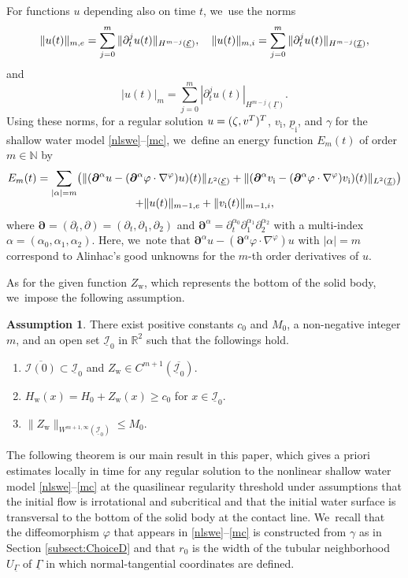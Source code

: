 \documentclass[11pt]{article}
\newenvironment{enumeratei}
{\bgroup\def\theenumi{\roman{enumi}}\def\theenumii{\arabic{enumii}}\begin{enumerate}}
{\end{enumerate}\egroup}
\newcommand{\R}{{\mathbb R}}
\newcommand{\dt}{\partial_t}
\newcommand{\cI}{{\mathcal I}}
\newcommand{\cE}{{\mathcal E}}
\newcommand{\ul}[1]{\underline{#1}}
\newcommand{\itGamma}{\mathit{\Gamma}}
\theoremstyle{definition}
\newtheorem{assumption}[theorem]{Assumption}
\begin{document}
For functions $u$ depending also on time $t$, we~use the norms
\[
\|u(t)\|_{m,{\rm e}}=\sum_{j=0}^m \|\dt^j u (t)\|_{H^{m-j}(\ul{\cE})}, \quad
\|u(t)\|_{m,{\rm i}}=\sum_{j=0}^m \|\dt^j u (t)\|_{H^{m-j}(\ul{\cI})},
\]
and
\[
|u(t)|_m = \sum_{j=0}^m |\dt^j u(t)|_{H^{m-j}(\ul{\itGamma})}.
\]
Using these norms, for a regular solution $u=(\zeta,v^{\rm T})^{\rm T}$, $v_\mathrm{i}$, $\ul{p}_\mathrm{i}$, and $\gamma$ for the shallow water model
\eqref{nlswe}--\eqref{mc}, we~define an energy function $E_m(t)$ of order $m\in\mathbb{N}$ by
\begin{multline*}
E_m(t)
= \sum_{|\alpha|=m} \bigl(\|(\bm{\partial}^\alpha u-(\bm{\partial}^\alpha\varphi\cdot\nabla^\varphi)u)(t)\|_{L^2(\ul{\cE})}
+ \|(\bm{\partial}^\alpha v_\mathrm{i}-(\bm{\partial}^\alpha\varphi\cdot\nabla^\varphi)v_\mathrm{i})(t)\|_{L^2(\ul{\cI})} \bigr) \\[-5pt]
+ \|u(t)\|_{m-1,{\rm e}} + \|v_\mathrm{i}(t)\|_{m-1,{\rm i}},
\end{multline*}
where $\bm{\partial}=(\dt,\partial)=(\dt,\partial_1,\partial_2)$ and $\bm{\partial}^\alpha=\dt^{\alpha_0}\partial_1^{\alpha_1}\partial_2^{\alpha_2}$
with a multi-index $\alpha=(\alpha_0,\alpha_1,\alpha_2)$.
Here, we~note that $\bm{\partial}^\alpha u-(\bm{\partial}^\alpha\varphi\cdot\nabla^\varphi)u$ with $|\alpha|=m$ correspond to Alinhac's good unknowns
for the $m$-th order derivatives of $u$.

As for the given function $Z_\mathrm{w}$, which represents the bottom of the solid body, we~impose the following assumption.

\begin{assumption}\label{ass:BSB}
There exist positive constants $c_0$ and $M_0$, a non-negative integer $m$, and an open set $\ul{\cI}_{0}$ in $\R^2$ such that the followings hold.
\begin{enumeratei}
\item\label{ass:BSBi}
$\overline{\cI(0)}\subset\ul{\cI}_{0}$ and $Z_\mathrm{w} \in C^{m+1}(\overline{\ul{\cI}_0})$.
\item\label{ass:BSBii}
$H_\mathrm{w}(x)=H_0+Z_\mathrm{w}(x) \geq c_0$ for $x\in\ul{\cI}_0$.
\item\label{ass:BSBiii}
$\|Z_\mathrm{w}\|_{W^{m+1,\infty}(\ul{\cI}_0)} \leq M_0$.
\end{enumeratei}
\end{assumption}

The following theorem is our main result in this paper, which gives a priori estimates locally in time for any regular solution to the nonlinear shallow water model
\eqref{nlswe}--\eqref{mc} at the quasilinear regularity threshold under assumptions that the initial flow is irrotational and subcritical
and that the initial water surface is transversal to the bottom of the solid body at the contact line. We~recall that the diffeomorphism $\varphi$ that appears in \eqref{nlswe}--\eqref{mc} is constructed from $\gamma$ as in Section \ref{subsect:ChoiceD}
and that $r_0$ is the width of the tubular neighborhood $U_{\ul{\itGamma}}$ of $\ul{\itGamma}$ in which normal-tangential coordinates are defined.
\end{document}
